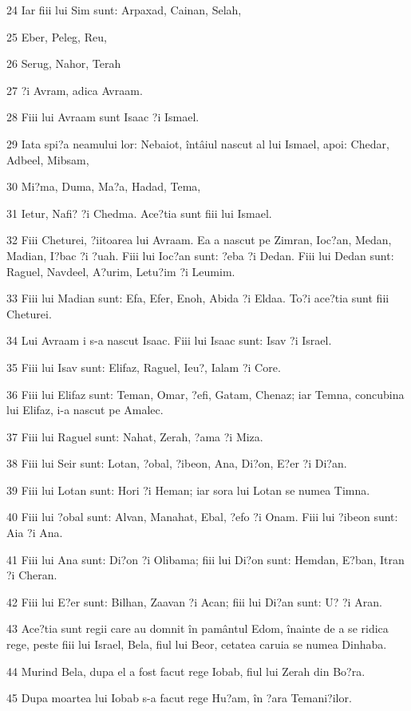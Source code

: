 \par 24 Iar fiii lui Sim sunt: Arpaxad, Cainan, Selah,
\par 25 Eber, Peleg, Reu,
\par 26 Serug, Nahor, Terah
\par 27 ?i Avram, adica Avraam.
\par 28 Fiii lui Avraam sunt Isaac ?i Ismael.
\par 29 Iata spi?a neamului lor: Nebaiot, întâiul nascut al lui Ismael, apoi: Chedar, Adbeel, Mibsam,
\par 30 Mi?ma, Duma, Ma?a, Hadad, Tema,
\par 31 Ietur, Nafi? ?i Chedma. Ace?tia sunt fiii lui Ismael.
\par 32 Fiii Cheturei, ?iitoarea lui Avraam. Ea a nascut pe Zimran, Ioc?an, Medan, Madian, I?bac ?i ?uah. Fiii lui Ioc?an sunt: ?eba ?i Dedan. Fiii lui Dedan sunt: Raguel, Navdeel, A?urim, Letu?im ?i Leumim.
\par 33 Fiii lui Madian sunt: Efa, Efer, Enoh, Abida ?i Eldaa. To?i ace?tia sunt fiii Cheturei.
\par 34 Lui Avraam i s-a nascut Isaac. Fiii lui Isaac sunt: Isav ?i Israel.
\par 35 Fiii lui Isav sunt: Elifaz, Raguel, Ieu?, Ialam ?i Core.
\par 36 Fiii lui Elifaz sunt: Teman, Omar, ?efi, Gatam, Chenaz; iar Temna, concubina lui Elifaz, i-a nascut pe Amalec.
\par 37 Fiii lui Raguel sunt: Nahat, Zerah, ?ama ?i Miza.
\par 38 Fiii lui Seir sunt: Lotan, ?obal, ?ibeon, Ana, Di?on, E?er ?i Di?an.
\par 39 Fiii lui Lotan sunt: Hori ?i Heman; iar sora lui Lotan se numea Timna.
\par 40 Fiii lui ?obal sunt: Alvan, Manahat, Ebal, ?efo ?i Onam. Fiii lui ?ibeon sunt: Aia ?i Ana.
\par 41 Fiii lui Ana sunt: Di?on ?i Olibama; fiii lui Di?on sunt: Hemdan, E?ban, Itran ?i Cheran.
\par 42 Fiii lui E?er sunt: Bilhan, Zaavan ?i Acan; fiii lui Di?an sunt: U? ?i Aran.
\par 43 Ace?tia sunt regii care au domnit în pamântul Edom, înainte de a se ridica rege, peste fiii lui Israel, Bela, fiul lui Beor, cetatea caruia se numea Dinhaba.
\par 44 Murind Bela, dupa el a fost facut rege Iobab, fiul lui Zerah din Bo?ra.
\par 45 Dupa moartea lui Iobab s-a facut rege Hu?am, în ?ara Temani?ilor.
